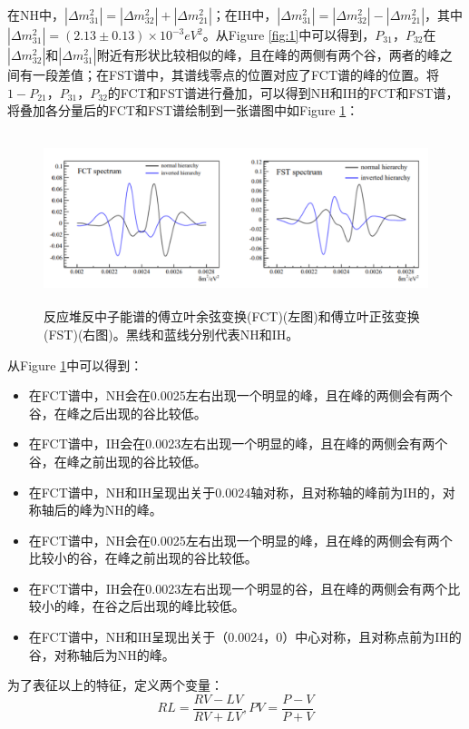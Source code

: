 \documentclass[10pt,a4paper]{article}
\begin{document}
在NH中，$|\Delta m_{31}^2|=|\Delta m_{32}^2|+|\Delta m_{21}^2|$；在IH中，$|\Delta m_{31}^2|=|\Delta m_{32}^2|-|\Delta m_{21}^2|$，其中$|\Delta m_{31}^2|=(2.13 \pm 0.13) \times 10^{-3}{eV}^2 $。从Figure \ref{fig:1}中可以得到，$P_{31}$，$P_{32}$在$|\Delta m_{32}^2|$和$|\Delta m_{31}^2|$附近有形状比较相似的峰，且在峰的两侧有两个谷，两者的峰之间有一段差值；在FST谱中，其谱线零点的位置对应了FCT谱的峰的位置。将$1-P_{21}$，$P_{31}$，$P_{32}$的FCT和FST谱进行叠加，可以得到NH和IH的FCT和FST谱，将叠加各分量后的FCT和FST谱绘制到一张谱图中如Figure \ref{fig:2}\cite{2009Experimental}：
\begin{figure}[H]
 \centering
 \includegraphics[height=5cm]{images/傅里叶图谱.png}
 \caption{反应堆反中子能谱的傅立叶余弦变换(FCT)(左图)和傅立叶正弦变换(FST)(右图)。黑线和蓝线分别代表NH和IH。}
 \label{fig:2}
\end{figure}

从Figure \ref{fig:2}中可以得到：
\begin{itemize}
	\item{在FCT谱中，NH会在0.0025左右出现一个明显的峰，且在峰的两侧会有两个谷，在峰之后出现的谷比较低。}
    \item{在FCT谱中，IH会在0.0023左右出现一个明显的峰，且在峰的两侧会有两个谷，在峰之前出现的谷比较低。}
    \item{在FCT谱中，NH和IH呈现出关于0.0024轴对称，且对称轴的峰前为IH的，对称轴后的峰为NH的峰。}
    \item{在FCT谱中，NH会在0.0025左右出现一个明显的峰，且在峰的两侧会有两个比较小的谷，在峰之前出现的谷比较低。}
    \item{在FCT谱中，IH会在0.0023左右出现一个明显的谷，且在峰的两侧会有两个比较小的峰，在谷之后出现的峰比较低。}
    \item{在FCT谱中，NH和IH呈现出关于（0.0024，0）中心对称，且对称点前为IH的谷，对称轴后为NH的峰。}
\end{itemize}

为了表征以上的特征，定义两个变量：
\[
RL=\frac{RV-LV}{RV+LV},
PV=\frac{P-V}{P+V}
\]
\end{document}
